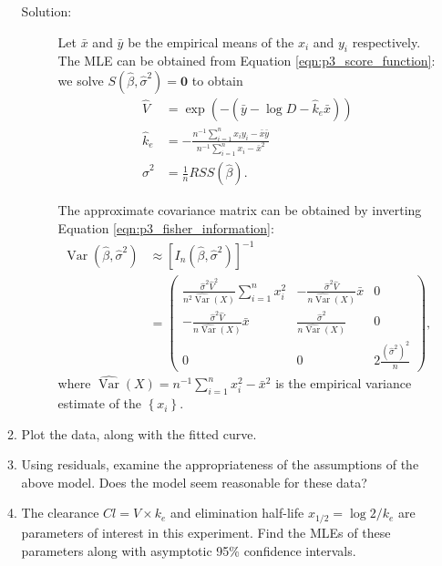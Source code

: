 \documentclass[letterpaper,11pt]{article}
\begin{document}
\begin{enumerate}
\begin{enumerate}
    \begin{description}
    \item[Solution:] Let $\bar{x}$ and $\bar{y}$ be the empirical means of the
      $x_i$ and $y_i$ respectively. The MLE can be obtained from Equation
      \ref{eqn:p3_score_function}: we solve
      $S\left(\hat{\beta}, \hat{\sigma}^2\right) = \mathbf{0}$ to obtain
      \begin{align*}
        \hat{V}
        &= \exp\left(
          -\left(\bar{y} - \log D - \hat{k}_e\bar{x}\right)
          \right) \\
        \hat{k}_e
        &= -\frac{n^{-1}\sum_{i=1}^nx_iy_i - \bar{x}\bar{y}}{n^{-1}\sum_{i=1}^nx_i - \bar{x}^2}\\
        \hat{\sigma}^2
        &= \frac{1}{n}RSS\left(\hat{\beta}\right).
      \end{align*}

      The approximate covariance matrix can be obtained by inverting Equation
      \ref{eqn:p3_fisher_information}:
      \begin{align}
        \operatorname{Var}\left(\hat{\beta}, \hat{\sigma}^2\right) &\approx
        \left[I_n\left(\hat{\beta}, \hat{\sigma}^2\right)\right]^{-1} \\
        &= \begin{pmatrix}
          \frac{\hat{\sigma}^2\hat{V}^2}{n^2\hat{\operatorname{Var}}\left(X\right)}\sum_{i=1}^nx_i^2 &
          -\frac{\hat{\sigma}^2\hat{V}}{n\hat{\operatorname{Var}}\left(X\right)}\bar{x} & 0 \\
          -\frac{\hat{\sigma}^2\hat{V}}{n\hat{\operatorname{Var}}\left(X\right)}\bar{x} &
            \frac{\hat{\sigma}^2}{n\hat{\operatorname{Var}}\left(X\right)} & 0 \\
          0 & 0 & 2\frac{\left(\hat{\sigma}^2\right)^2}{n}
        \end{pmatrix}, \nonumber
      \end{align}
      where
      $\hat{\operatorname{Var}}\left(X\right) = n^{-1}\sum_{i=1}^nx_i^2 -
      \bar{x}^2$ is the empirical variance estimate of the $\left\{x_i\right\}$.
    \end{description}
    
  \item Plot the data, along with the fitted curve.
  \item Using residuals, examine the appropriateness of the assumptions of the
    above model. Does the model seem reasonable for these data?
  \item The clearance $Cl = V \times k_e$ and elimination half-life
    $x_{1/2} = \log 2/k_e$ are parameters of interest in this experiment. Find
    the MLEs of these parameters along with asymptotic 95\% confidence intervals.
  \end{enumerate}
\end{enumerate}
\end{document}

